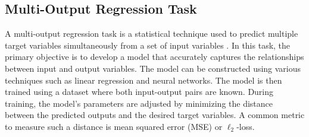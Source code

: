 \subsection{Multi-Output Regression Task}
A multi-output regression task is a statistical technique used to predict multiple target variables simultaneously from a set of input variables \cite{borchani2015survey}. In this task, the primary objective is to develop a model that accurately captures the relationships between input and output variables. The model can be constructed using various techniques such as linear regression and neural networks. The model is then trained using a dataset where both input-output pairs are known. During training, the model's parameters are adjusted by minimizing the distance between the predicted outputs and the desired target variables. A common metric to measure such a distance is mean squared error (MSE) or $\ell_2$-loss. 














